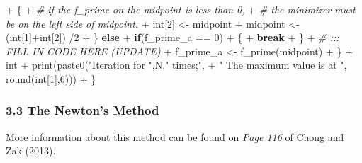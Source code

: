 \documentclass[
]{article}
\newenvironment{Shaded}{\begin{snugshade}}{\end{snugshade}}
\newcommand{\CommentTok}[1]{\textcolor[rgb]{0.56,0.35,0.01}{\textit{#1}}}
\newcommand{\ControlFlowTok}[1]{\textcolor[rgb]{0.13,0.29,0.53}{\textbf{#1}}}
\newcommand{\DecValTok}[1]{\textcolor[rgb]{0.00,0.00,0.81}{#1}}
\newcommand{\FunctionTok}[1]{\textcolor[rgb]{0.00,0.00,0.00}{#1}}
\newcommand{\NormalTok}[1]{#1}
\newcommand{\OtherTok}[1]{\textcolor[rgb]{0.56,0.35,0.01}{#1}}
\newcommand{\SpecialCharTok}[1]{\textcolor[rgb]{0.00,0.00,0.00}{#1}}
\newcommand{\StringTok}[1]{\textcolor[rgb]{0.31,0.60,0.02}{#1}}
\begin{document}
\begin{Shaded}
\begin{Highlighting}[]
\SpecialCharTok{+}\NormalTok{       \{}
\SpecialCharTok{+}         \CommentTok{\# if the f\_prime on the midpoint is less than 0,}
\SpecialCharTok{+}         \CommentTok{\# the minimizer must be on the left side of midpoint.}
\SpecialCharTok{+}\NormalTok{         int[}\DecValTok{2}\NormalTok{] }\OtherTok{\textless{}{-}}\NormalTok{ midpoint}
\SpecialCharTok{+}\NormalTok{         midpoint }\OtherTok{\textless{}{-}}\NormalTok{ (int[}\DecValTok{1}\NormalTok{]}\SpecialCharTok{+}\NormalTok{int[}\DecValTok{2}\NormalTok{]) }\SpecialCharTok{/}\DecValTok{2}
\SpecialCharTok{+}\NormalTok{       \} }\ControlFlowTok{else}
\SpecialCharTok{+}         \ControlFlowTok{if}\NormalTok{(f\_prime\_a }\SpecialCharTok{==} \DecValTok{0}\NormalTok{)}
\SpecialCharTok{+}\NormalTok{         \{}
\SpecialCharTok{+}           \ControlFlowTok{break}
\SpecialCharTok{+}\NormalTok{         \}}
\SpecialCharTok{+}     \CommentTok{\# ::: FILL IN CODE HERE (UPDATE)}
\SpecialCharTok{+}\NormalTok{     f\_prime\_a }\OtherTok{\textless{}{-}} \FunctionTok{f\_prime}\NormalTok{(midpoint)}
\SpecialCharTok{+}\NormalTok{   \}}
\SpecialCharTok{+}\NormalTok{   int}
\SpecialCharTok{+}   \FunctionTok{print}\NormalTok{(}\FunctionTok{paste0}\NormalTok{(}\StringTok{"Iteration for "}\NormalTok{,N,}\StringTok{" times;"}\NormalTok{,}
\SpecialCharTok{+}                \StringTok{" The maximum value is at "}\NormalTok{, }\FunctionTok{round}\NormalTok{(int[}\DecValTok{1}\NormalTok{],}\DecValTok{6}\NormalTok{)))}
\SpecialCharTok{+}\NormalTok{ \}}
\end{Highlighting}
\end{Shaded}

\hypertarget{the-newtons-method}{%
\subsubsection{3.3 The Newton's Method}\label{the-newtons-method}}

More information about this method can be found on \emph{Page 116} of
Chong and Zak (2013).
\end{document}
